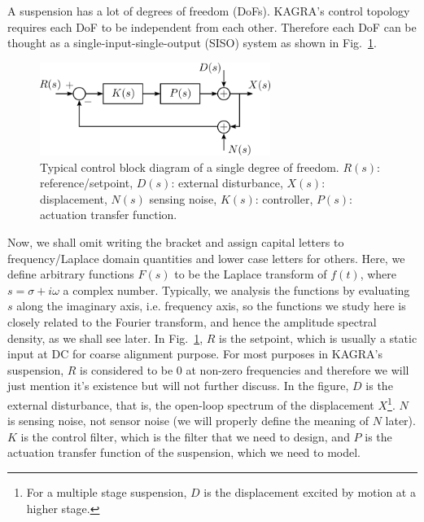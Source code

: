 A suspension has a lot of degrees of freedom (DoFs).
KAGRA's control topology requires each DoF to be independent from each other.
Therefore each DoF can be thought as a single-input-single-output (SISO) system as shown in Fig.~\ref{fig:generalcontrolblockdiagram}.
\begin{figure}[!h]
	\centering
	\includegraphics[width=75mm]{figures/general_control_block_diagram}
	\caption{Typical control block diagram of a single degree of freedom. $R(s)$: reference/setpoint, $D(s)$: external disturbance, $X(s)$: displacement, $N(s)$ sensing noise, $K(s)$: controller, $P(s)$: actuation transfer function.}
	\label{fig:generalcontrolblockdiagram}
\end{figure}
Now, we shall omit writing the bracket and assign capital letters to frequency/Laplace domain quantities and lower case letters for others.
Here, we define arbitrary functions $F(s)$ to be the Laplace transform of $f(t)$, where $s=\sigma+i\omega$ a complex number.
Typically, we analysis the functions by evaluating $s$ along the imaginary axis, i.e. frequency axis, so the functions we study here is closely related to the Fourier transform, and hence the amplitude spectral density, as we shall see later.
In Fig.~\ref{fig:generalcontrolblockdiagram}, $R$ is the setpoint, which is usually a static input at DC for coarse alignment purpose.
For most purposes in KAGRA's suspension, $R$ is considered to be $0$ at non-zero frequencies and therefore we will just mention it's existence but will not further discuss.
In the figure, $D$ is the external disturbance, that is, the open-loop spectrum of the displacement $X$\footnote{For a multiple stage suspension, $D$ is the displacement excited by motion at a higher stage.}.
$N$ is sensing noise, not sensor noise (we will properly define the meaning of $N$ later).
$K$ is the control filter, which is the filter that we need to design, and $P$ is the actuation transfer function of the suspension, which we need to model.


